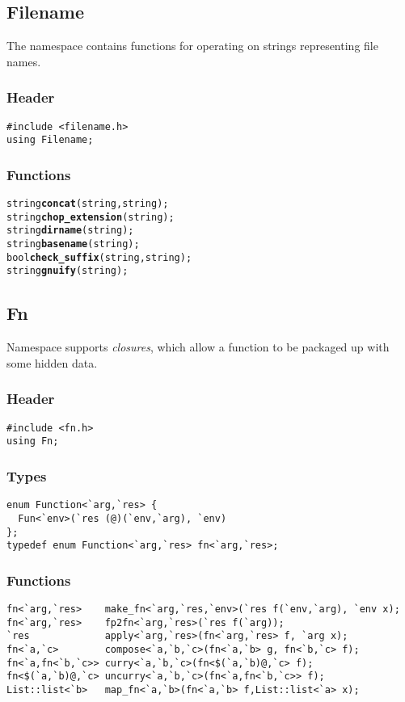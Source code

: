 \subsection{Filename}

The  namespace contains functions for operating on
strings representing file names.

\subsubsection*{Header}
\begin{verbatim}
#include <filename.h>
using Filename;
\end{verbatim}

\subsubsection*{Functions}
\begin{alltt}
string \textbf{concat}(string, string);
string \textbf{chop_extension}(string);
string \textbf{dirname}(string);
string \textbf{basename}(string);
bool   \textbf{check_suffix}(string, string);
string \textbf{gnuify}(string);
\end{alltt}

\subsection{Fn}

Namespace  supports \emph{closures}, which allow a function to
be packaged up with some hidden data.

\subsubsection*{Header}
\begin{verbatim}
#include <fn.h>
using Fn;
\end{verbatim}

\subsubsection*{Types}
\begin{verbatim}
enum Function<`arg,`res> {
  Fun<`env>(`res (@)(`env,`arg), `env)
};
typedef enum Function<`arg,`res> fn<`arg,`res>;
\end{verbatim}

\subsubsection*{Functions}
\begin{verbatim}
fn<`arg,`res>    make_fn<`arg,`res,`env>(`res f(`env,`arg), `env x);
fn<`arg,`res>    fp2fn<`arg,`res>(`res f(`arg));
`res             apply<`arg,`res>(fn<`arg,`res> f, `arg x);
fn<`a,`c>        compose<`a,`b,`c>(fn<`a,`b> g, fn<`b,`c> f);
fn<`a,fn<`b,`c>> curry<`a,`b,`c>(fn<$(`a,`b)@,`c> f);
fn<$(`a,`b)@,`c> uncurry<`a,`b,`c>(fn<`a,fn<`b,`c>> f);
List::list<`b>   map_fn<`a,`b>(fn<`a,`b> f,List::list<`a> x);
\end{verbatim}

